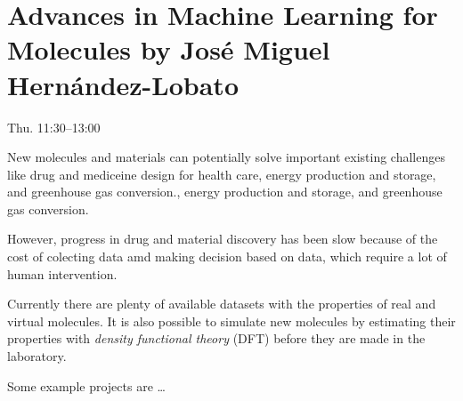 \documentclass[b5paper]{report}
\begin{document}
\chapter{Advances in Machine Learning for Molecules by José Miguel
Hernández-Lobato}

Thu. 11:30--13:00

New molecules and materials can potentially solve important existing challenges
like drug and mediceine design for health care, energy production and storage,
and greenhouse gas conversion., energy production and storage, and greenhouse
gas conversion.

However, progress in drug and material discovery has been slow because of the
cost of colecting data amd making decision based on data, which require a lot
of human intervention.

Currently there are plenty of available datasets with the properties of real
and virtual molecules. It is also possible to simulate new molecules by
estimating their properties with \emph{density functional theory} (DFT) before
they are made in the laboratory.

Some example projects are \dots
\end{document}

